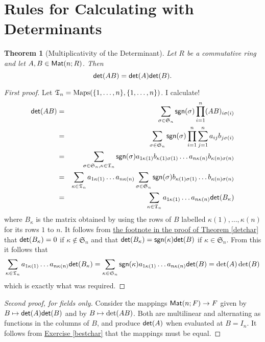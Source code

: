 \documentclass[11pt]{amsbook}
\newtheorem{theorem}{Theorem}[section]
\theoremstyle{definition}
\begin{document}
\section{Rules for Calculating with Determinants}
\begin{theorem}[Multiplicativity of the Determinant]\label{detismult} Let $R$ be a commutative ring and let $A, B \in {\sf Mat}(n;R)$. Then $${\sf det}(AB) = {\sf det}(A) {\sf det}(B).$$
\end{theorem}
\begin{proof}[First proof]
Let $\mathfrak{T}_n = {\rm Maps} (\{1, \ldots , n\}, \{1, \ldots , n\})$. I calculate!
\begin{eqnarray*}
{\sf det}(AB) & = & \sum_{\sigma \in \mathfrak{S}_n} {\sf sgn}(\sigma) \prod_{i=1}^n (AB)_{i\sigma(i)} \\ & = & \sum_{\sigma \in \mathfrak{S}_n} {\sf sgn}(\sigma) \prod_{i=1}^n \sum_{j=1}^n a_{ij} b_{j\sigma(i)} \\
& = & \sum_{\sigma\in \mathfrak{S}_n, \kappa \in \mathfrak{T}_n} {\sf sgn}(\sigma) a_{1\kappa(1)}b_{\kappa(1) \sigma(1)} \ldots a_{n \kappa(n)} b_{\kappa (n) \sigma (n)} \\
& = &\sum_{\kappa\in \mathfrak{T}_n} a_{1\kappa(1)} \ldots a_{n \kappa(n)} \sum_{\sigma \in \mathfrak{S}_n} {\sf sgn}(\sigma) b_{\kappa(1) \sigma(1)}\ldots b_{\kappa (n) \sigma (n)} \\
& = & \sum_{\kappa\in \mathfrak{T}_n}  a_{1\kappa(1)} \ldots a_{n \kappa(n)} {\sf det} (B_{\kappa})
\end{eqnarray*} where $B_{\kappa}$ is the matrix obtained by using the rows of $B$ labelled $\kappa(1), \ldots , \kappa (n)$ for its rows $1$ to $n$. It follows from \hyperref[detchar]{the footnote in the proof of Theorem \ref{detchar}} that ${\sf det}(B_{\kappa}) =0$ if $\kappa \notin \mathfrak{S}_n$ and that ${\sf det}(B_{\kappa}) = {\sf sgn}(\kappa) {\sf det} (B)$ if $\kappa\in \mathfrak{S}_n$. From this it follows that $$ \sum_{\kappa\in \mathfrak{T}_n}  a_{1\kappa(1)} \ldots a_{n \kappa(n)} {\sf det} (B_{\kappa})
 = \sum_{\kappa\in \mathfrak{S}_n}  {\sf sgn}(\kappa) a_{1\kappa(1)} \ldots a_{n \kappa(n)} {\sf det} (B) = \det (A) \det (B)$$ which is exactly what was required.
\end{proof}

\begin{proof}[Second proof, for fields only]
Consider the mappings ${\sf Mat}(n; F)\to F$ given by $B\mapsto {\sf det}(A) {\sf det}(B)$ and by $B \mapsto {\sf \det}(AB)$. Both are multilinear and alternating as functions in the columns of $B$, and produce ${\sf det}(A)$ when evaluated at $B=I_n$. It follows from \hyperref[bestchar]{Exercise \ref{bestchar}} that the mappings must be equal.
\end{proof}
\end{document}
